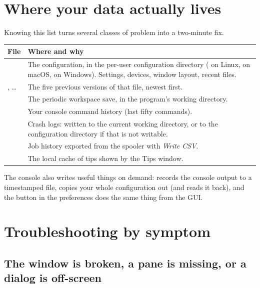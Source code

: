\section{Where your data actually lives}

Knowing this list turns several classes of problem into a two-minute fix.

\begin{center}\small
\begin{tabular}{@{}L{5.0cm}L{9.2cm}@{}}
\toprule
\textbf{File} & \textbf{Where and why} \\
\midrule
{} & The configuration, in the per-user configuration directory
( on Linux,
 on macOS,
 on Windows).
Settings, devices, window layout, recent files. \\
, \dots{} & The five previous versions of
that file, newest first. \\
 & The periodic workspace save, in the program's working
directory. \\
 & Your console command history (last fifty commands). \\
 & Crash logs: written to the current working
directory, or to the configuration directory if that is not writable. \\
 & Job history exported from the spooler with \emph{Write
CSV}. \\
 & The local cache of tips shown by the Tips window. \\
\bottomrule
\end{tabular}
\end{center}

\noindent The console also writes useful things on demand:
 records the console output to a timestamped file,
 copies your whole configuration out (and
 reads it back), and the  button in the
preferences does the same thing from the GUI.

\section{Troubleshooting by symptom}

\subsection*{The window is broken, a pane is missing, or a dialog is off-screen}

